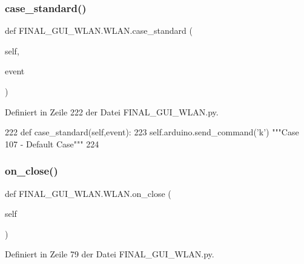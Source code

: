 \subsubsection{\texorpdfstring{case\+\_\+standard()}{case\_standard()}}
{\footnotesize\ttfamily def F\+I\+N\+A\+L\+\_\+\+G\+U\+I\+\_\+\+W\+L\+A\+N.\+W\+L\+A\+N.\+case\+\_\+standard (\begin{DoxyParamCaption}\item[{}]{self,  }\item[{}]{event }\end{DoxyParamCaption})}



Definiert in Zeile 222 der Datei F\+I\+N\+A\+L\+\_\+\+G\+U\+I\+\_\+\+W\+L\+A\+N.\+py.


\begin{DoxyCode}
222     \textcolor{keyword}{def }case\_standard(self,event):
223         self.arduino.send\_command(\textcolor{stringliteral}{'k'})  \textcolor{stringliteral}{"""Case 107 - Default Case"""}
224     
\end{DoxyCode}
\mbox{\label{class_f_i_n_a_l___g_u_i___w_l_a_n_1_1_w_l_a_n_ae429bf3b670d0b265edc4b1a220d9c6a}} 
\subsubsection{\texorpdfstring{on\+\_\+close()}{on\_close()}}
{\footnotesize\ttfamily def F\+I\+N\+A\+L\+\_\+\+G\+U\+I\+\_\+\+W\+L\+A\+N.\+W\+L\+A\+N.\+on\+\_\+close (\begin{DoxyParamCaption}\item[{}]{self }\end{DoxyParamCaption})}



Definiert in Zeile 79 der Datei F\+I\+N\+A\+L\+\_\+\+G\+U\+I\+\_\+\+W\+L\+A\+N.\+py.


